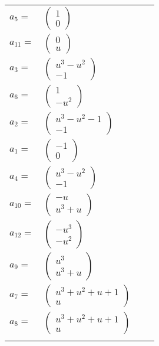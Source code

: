 \documentclass[1p]{elsarticle_modified}
\theoremstyle{definition}
\begin{document}
\begin{tabular}{m{7pt} m{180pt} m{7pt} m{180pt} }
\flushright $a_{5}=$&$\begin{pmatrix}1\\0\end{pmatrix}$ \\
\flushright $a_{11}=$&$\begin{pmatrix}0\\u\end{pmatrix}$ \\
\flushright $a_{3}=$&$\begin{pmatrix}u^3- u^2\\-1\end{pmatrix}$ \\
\flushright $a_{6}=$&$\begin{pmatrix}1\\- u^2\end{pmatrix}$ \\
\flushright $a_{2}=$&$\begin{pmatrix}u^3- u^2-1\\-1\end{pmatrix}$ \\
\flushright $a_{1}=$&$\begin{pmatrix}-1\\0\end{pmatrix}$ \\
\flushright $a_{4}=$&$\begin{pmatrix}u^3- u^2\\-1\end{pmatrix}$ \\
\flushright $a_{10}=$&$\begin{pmatrix}- u\\u^3+u\end{pmatrix}$ \\
\flushright $a_{12}=$&$\begin{pmatrix}- u^3\\- u^2\end{pmatrix}$ \\
\flushright $a_{9}=$&$\begin{pmatrix}u^3\\u^3+u\end{pmatrix}$ \\
\flushright $a_{7}=$&$\begin{pmatrix}u^3+u^2+u+1\\u\end{pmatrix}$ \\
\flushright $a_{8}=$&$\begin{pmatrix}u^3+u^2+u+1\\u\end{pmatrix}$\\&\end{tabular}
\end{document}
